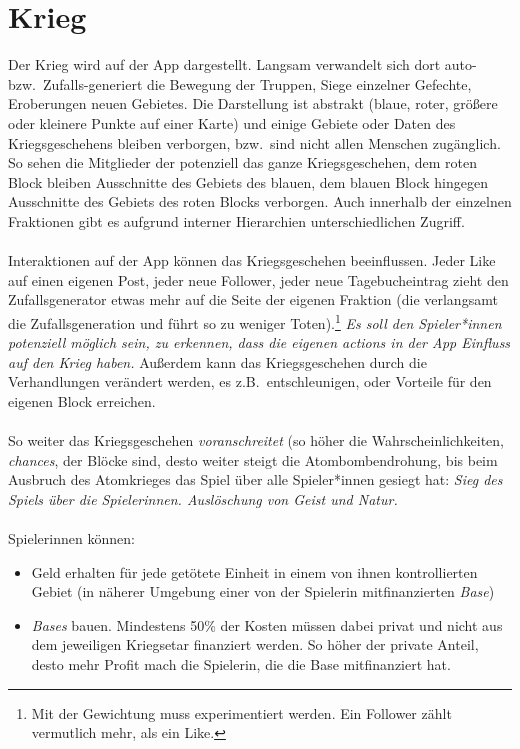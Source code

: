 \section{Krieg}
Der Krieg wird auf der App dargestellt. 
Langsam verwandelt sich dort auto- bzw.~Zufalls-generiert die Bewegung der
Truppen, Siege einzelner Gefechte, Eroberungen neuen Gebietes. 
Die Darstellung ist abstrakt (blaue, roter, größere oder kleinere Punkte auf
einer Karte) und einige Gebiete oder Daten des Kriegsgeschehens bleiben
verborgen, bzw.~sind nicht allen Menschen zugänglich. 
So sehen die Mitglieder der  potenziell das ganze
Kriegsgeschehen, dem roten Block bleiben Ausschnitte des Gebiets des blauen, dem
blauen Block hingegen Ausschnitte des Gebiets des roten Blocks verborgen. Auch
innerhalb der einzelnen Fraktionen gibt es aufgrund interner Hierarchien
unterschiedlichen Zugriff.\\\\
%
Interaktionen auf der App können das Kriegsgeschehen beeinflussen. 
Jeder Like auf einen eigenen Post, jeder neue Follower, jeder neue
Tagebucheintrag zieht den Zufallsgenerator etwas mehr auf die Seite der eigenen
Fraktion (die  verlangsamt die Zufallsgeneration und führt so zu
weniger Toten).\footnote{
  Mit der Gewichtung muss experimentiert werden. Ein Follower zählt vermutlich
  mehr, als ein Like.
}
\emph{Es soll den Spieler*innen potenziell möglich sein, zu erkennen, dass die
eigenen actions in der App Einfluss auf den Krieg haben.}
Außerdem kann das Kriegsgeschehen durch die Verhandlungen verändert werden,
es z.B.~entschleunigen, oder Vorteile für den eigenen Block erreichen.\\\\
% 
So weiter das Kriegsgeschehen \emph{voranschreitet} (so höher die
Wahrscheinlichkeiten, \emph{chances}, der Blöcke sind, desto weiter steigt die
Atombombendrohung, bis beim Ausbruch des Atomkrieges das Spiel über alle
Spieler*innen gesiegt hat: \emph{Sieg des Spiels über die Spielerinnen.
Auslöschung von Geist und Natur.}\\\\
%
Spielerinnen können: 
\begin{itemize}
  \item Geld erhalten für jede getötete Einheit in einem von ihnen
    kontrollierten Gebiet (in näherer Umgebung einer von der Spielerin
    mitfinanzierten \emph{Base})
  \item \emph{Bases} bauen. Mindestens 50\% der Kosten müssen dabei privat und nicht
    aus dem jeweiligen Kriegsetar finanziert werden. So höher der private
    Anteil, desto mehr Profit mach die Spielerin, die die Base mitfinanziert
    hat.
\end{itemize}

